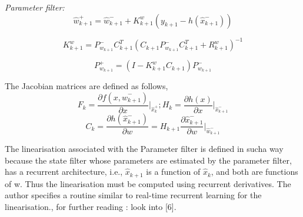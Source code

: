 \documentclass[letterpaper, 10pt, conference]{ieeeconf}      %
\begin{document}
\textit{Parameter filter:}
$$\hat{w}_{k+1}^{+} = \hat{w}_{k+1}^{-} + K^{w}_{k+1}(y_{k+1} - h(\hat{x}_{k+1}^{-})) $$

$$K^{w}_{k+1} = P_{w_{k+1}}^{-}C_{k+1}^{T}(C_{k+1}P_{w_{k+1}}^{-}C_{k+1}^{T} + R_{k+1}^{w})^{-1} $$

$$P_{w_{k+1}}^{+} = (I-K^{w}_{k+1}C_{k+1})P_{w_{k+1}}^{-}$$

The Jacobian matrices are defined as follows,
$$F_{k} = \frac{\partial f(x,\hat{w}_{k+1}^{-})}{\partial x}\bigg|_{\hat{x}_{k}^{+}} ; H_{k} = \frac{\partial h(x)}{\partial x}\bigg|_{\hat{x}_{k+1}^{-}} $$
$$ C_{k} = \frac{\partial h(\hat{x}_{k+1}^{-})}{\partial w} = H_{k+1}\frac{\partial \hat{x}_{k+1}^{-}}{\partial w}\bigg|_{\hat{w}_{k+1}^{-}} $$
\linebreak

The linearisation associated with the Parameter filter is defined in sucha way because the state filter whose parameters are estimated by the parameter filter, has a recurrent architecture, i.e., $\hat{x}_{k+1}$ is a function of $\hat{x}_{k}$, and both are functions of w. Thus the linearisation must be computed using recurrent derivatives. The author specifies a routine similar to real-time recurrent learning for the linearisation., for further reading : look into [6]. 
%




\addtolength{\textheight}{-12cm}   %
\end{document}
